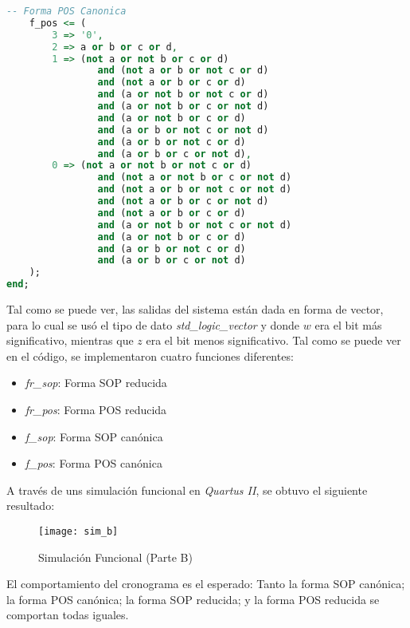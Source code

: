 \documentclass[../procedimientos.tex]{subfiles}
\begin{document}
\begin{lstlisting}[language=VHDL, caption=Archivo VHDL (Parte B)]
	-- Forma POS Canonica
	f_pos <= (
		3 => '0',
		2 => a or b or c or d,
		1 => (not a or not b or c or d)
				and (not a or b or not c or d)
				and (not a or b or c or d)
				and (a or not b or not c or d)
				and (a or not b or c or not d)
				and (a or not b or c or d)
				and (a or b or not c or not d)
				and (a or b or not c or d)
				and (a or b or c or not d),
		0 => (not a or not b or not c or d)
				and (not a or not b or c or not d)
				and (not a or b or not c or not d)
				and (not a or b or c or not d)
				and (not a or b or c or d)
				and (a or not b or not c or not d)
				and (a or not b or c or d)
				and (a or b or not c or d)
				and (a or b or c or not d)
	);
end;
\end{lstlisting}

Tal como se puede ver, las salidas del sistema están dada en forma de vector, 
para lo cual se usó el tipo de dato \textit{std\_logic\_vector} y donde $w$ 
era el bit más significativo, mientras que $z$ era el bit menos significativo.  
Tal como se puede ver en el código, se implementaron cuatro funciones 
diferentes:
\begin{itemize}
  \item \textit{fr\_sop}: Forma SOP reducida
  \item \textit{fr\_pos}: Forma POS reducida
  \item \textit{f\_sop}: Forma SOP canónica
  \item \textit{f\_pos}: Forma POS canónica
\end{itemize}

A través de uns simulación funcional en \textit{Quartus II}, se obtuvo el 
siguiente resultado:
\begin{figure}[H]
  \centering
  \texttt{[image: sim\_b]}
  \caption{Simulación Funcional (Parte B)}
\end{figure}

El comportamiento del cronograma es el esperado: Tanto la forma SOP canónica; 
la forma POS canónica; la forma SOP reducida; y la forma POS reducida se 
comportan todas iguales.
\end{document}
